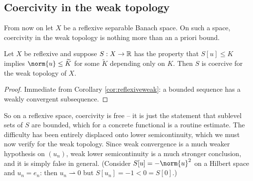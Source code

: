 \documentclass[a4paper]{scrartcl}
\newcommand{\wt}{\widetilde}
\newcommand{\weakto}{\rightharpoonup}
\begin{document}
\begin{center}
\end{center}

\subsection{Coercivity in the weak topology}

From now on let $X$ be a reflexive separable Banach space. On such a space, coercivity in the weak topology is nothing more than an a priori bound.

\begin{lemma}\label{lem:weakcoercive}
	Let $X$ be reflexive and suppose $S : X \to \mathbb{R}$ has the property that $S[u]\le K$ implies $\norm{u}\le \wt K$ for some $\wt K$ depending only on $K$. Then $S$ is coercive for the weak topology of $X$.
\end{lemma}

\begin{proof}
	Immediate from Corollary \ref{cor:reflexiveweak}: a bounded sequence has a weakly convergent subsequence.
\end{proof}

So on a reflexive space, coercivity is free -- it is just the statement that sublevel sets of $S$ are bounded, which for a concrete functional is a routine estimate. The difficulty has been entirely displaced onto lower semicontinuity, which we must now verify for the weak topology. Since weak convergence is a much weaker hypothesis on $(u_n)$, weak lower semicontinuity is a much stronger conclusion, and it is simply false in general. (Consider $S[u] = -\norm{u}^2$ on a Hilbert space and $u_n = e_n$: then $u_n \weakto 0$ but $S[u_n] = -1 < 0 = S[0]$.)
\end{document}

